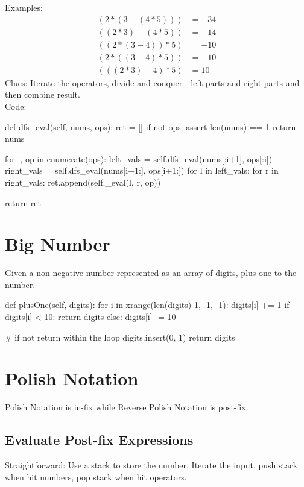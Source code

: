 Examples:
\begin{align*}
(2*(3-(4*5))) &= -34 \\
((2*3)-(4*5)) &= -14 \\
((2*(3-4))*5) &= -10 \\
(2*((3-4)*5)) &= -10 \\
(((2*3)-4)*5) &= 10
\end{align*}
Clues: Iterate the operators, divide and conquer - left parts and right parts and then combine result. \\
Code:
\begin{python}
def dfs_eval(self, nums, ops):
    ret = []
    if not ops:
        assert len(nums) == 1
        return nums

    for i, op in enumerate(ops):
        left_vals = self.dfs_eval(nums[:i+1], ops[:i])
        right_vals = self.dfs_eval(nums[i+1:], ops[i+1:])
        for l in left_vals:
            for r in right_vals:
                ret.append(self._eval(l, r, op))

    return ret
\end{python}

\section{Big Number}
 Given a non-negative number represented as an array of digits, plus one to the number.
\begin{python}
def plusOne(self, digits):
    for i in xrange(len(digits)-1, -1, -1):
        digits[i] += 1
        if digits[i] < 10:
            return digits
        else:
            digits[i] -= 10

    # if not return within the loop 
    digits.insert(0, 1)
    return digits
\end{python}

\section{Polish Notation}
Polish Notation is in-fix while Reverse Polish Notation is post-fix. 
\subsection{Evaluate Post-fix Expressions}
Straightforward: Use a stack to store the number. Iterate the input, push stack when
hit numbers, pop stack when hit operators.
